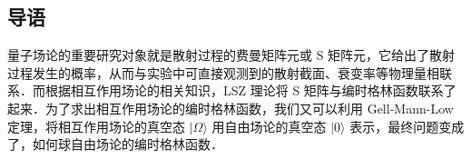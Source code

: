 
\subsection{导语}
量子场论的重要研究对象就是散射过程的费曼矩阵元或 S 矩阵元，它给出了散射过程发生的概率，从而与实验中可直接观测到的散射截面、衰变率等物理量相联系．而根据相互作用场论的相关知识，LSZ 理论将 S 矩阵与编时格林函数联系了起来．为了求出相互作用场论的编时格林函数，我们又可以利用 Gell-Mann-Low 定理，将相互作用场论的真空态 $|\Omega\rangle$ 用自由场论的真空态 $|0\rangle$ 表示，最终问题变成了，如何球自由场论的编时格林函数．